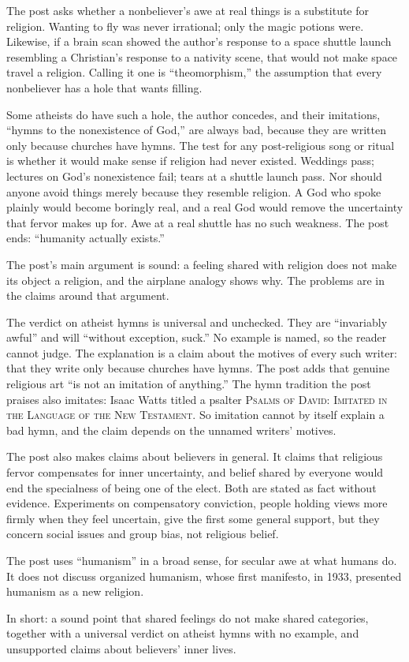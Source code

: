 \begin{afterword}
\summaryhead

The post asks whether a nonbeliever's awe at real things is a substitute for religion. Wanting to fly was never irrational; only the magic potions were. Likewise, if a brain scan showed the author's response to a space shuttle launch resembling a Christian's response to a nativity scene, that would not make space travel a religion. Calling it one is ``theomorphism,'' the assumption that every nonbeliever has a hole that wants filling.

Some atheists do have such a hole, the author concedes, and their imitations, ``hymns to the nonexistence of God,'' are always bad, because they are written only because churches have hymns. The test for any post-religious song or ritual is whether it would make sense if religion had never existed. Weddings pass; lectures on God's nonexistence fail; tears at a shuttle launch pass. Nor should anyone avoid things merely because they resemble religion. A God who spoke plainly would become boringly real, and a real God would remove the uncertainty that fervor makes up for. Awe at a real shuttle has no such weakness. The post ends: ``humanity actually exists.''

\responsehead

The post's main argument is sound: a feeling shared with religion does not make its object a religion, and the airplane analogy shows why. The problems are in the claims around that argument.

The verdict on atheist hymns is universal and unchecked. They are ``invariably awful'' and will ``without exception, suck.'' No example is named, so the reader cannot judge. The explanation is a claim about the motives of every such writer: that they write only because churches have hymns. The post adds that genuine religious art ``is not an imitation of anything.'' The hymn tradition the post praises also imitates: Isaac Watts titled a psalter \textsc{Psalms of David: Imitated in the Language of the New Testament}. So imitation cannot by itself explain a bad hymn, and the claim depends on the unnamed writers' motives.

The post also makes claims about believers in general. It claims that religious fervor compensates for inner uncertainty, and belief shared by everyone would end the specialness of being one of the elect. Both are stated as fact without evidence. Experiments on compensatory conviction, people holding views more firmly when they feel uncertain, give the first some general support, but they concern social issues and group bias, not religious belief.

The post uses ``humanism'' in a broad sense, for secular awe at what humans do. It does not discuss organized humanism, whose first manifesto, in 1933, presented humanism as a new religion.

In short: a sound point that shared feelings do not make shared categories, together with a universal verdict on atheist hymns with no example, and unsupported claims about believers' inner lives.
\end{afterword}
